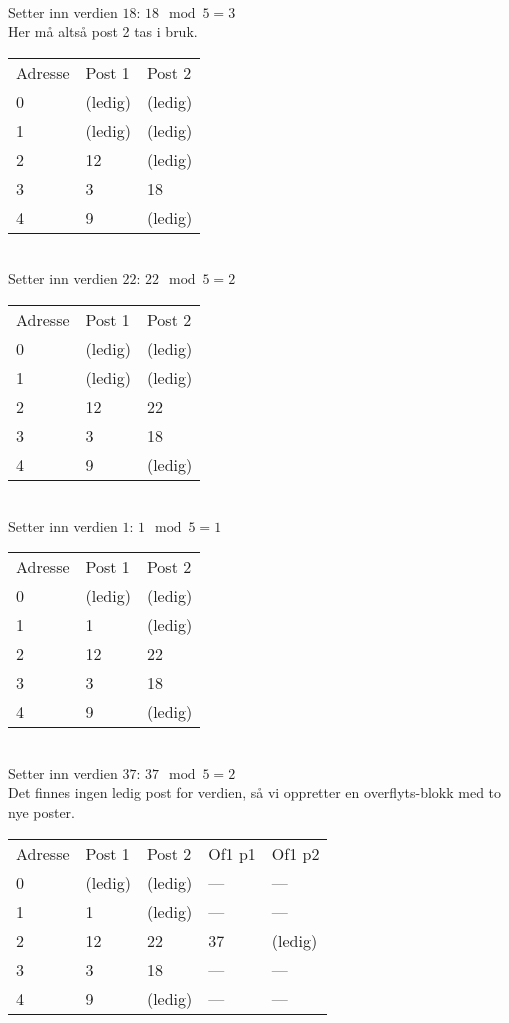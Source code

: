 \documentclass[a4paper, 12pt] {article}
\begin{document}
~\\
Setter inn verdien $18$: $18 \mod 5 = 3$\\
Her må altså post 2 tas i bruk.\\
\begin{tabular}{|l|l|l|}
    \hline
    Adresse & Post 1 & Post 2 \\
    0       & (ledig)& (ledig)\\
    1       & (ledig)& (ledig)\\
    2       & 12     & (ledig)\\
    3       & 3      & 18      \\
    4       & 9      & (ledig)\\ \hline
\end{tabular}

~\\
Setter inn verdien $22$: $22 \mod 5 = 2$\\
\begin{tabular}{|l|l|l|}
    \hline
    Adresse & Post 1 & Post 2 \\
    0       & (ledig)& (ledig)\\
    1       & (ledig)& (ledig)\\
    2       & 12     & 22     \\
    3       & 3      & 18     \\
    4       & 9      & (ledig)\\ \hline
\end{tabular}

~\\
Setter inn verdien $1$: $1 \mod 5 = 1$\\
\begin{tabular}{|l|l|l|}
    \hline
    Adresse & Post 1 & Post 2 \\
    0       & (ledig)& (ledig)\\
    1       & 1      & (ledig)\\
    2       & 12     & 22     \\
    3       & 3      & 18     \\
    4       & 9      & (ledig)\\ \hline
\end{tabular}

~\\
Setter inn verdien $37$: $37 \mod 5 = 2$\\
Det finnes ingen ledig post for verdien, så vi oppretter en overflyts-blokk med to nye poster.\\
\begin{tabular}{|l|l|l|l|l|}
    \hline
    Adresse & Post 1 & Post 2 & Of1 p1 & Of1 p2 \\
    0       & (ledig)& (ledig)& ---   & ---   \\
    1       & 1      & (ledig)& ---   & ---   \\
    2       & 12     & 22     & 37     & (ledig)\\
    3       & 3      & 18     & ---   & ---   \\
    4       & 9      & (ledig)& ---   & ---   \\ \hline
\end{tabular}
\end{document}
